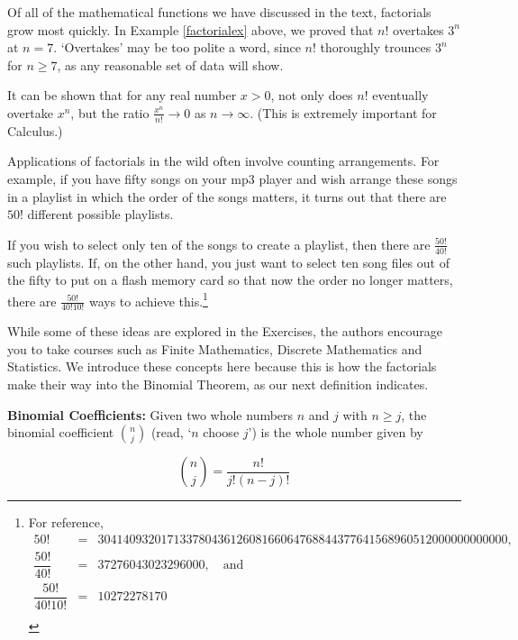 \documentclass{ximera}
\begin{document}
Of all of the mathematical functions we have discussed in the text, factorials grow most quickly.  In  Example \ref{factorialex} above, we proved that $n!$ overtakes $3^{n}$ at $n=7$.  `Overtakes' may be too polite a word, since $n!$ thoroughly trounces $3^n$ for $n \geq 7$, as any reasonable set of data will show. 

\smallskip

It can be shown that for any real number $x > 0$, not only does $n!$ eventually overtake $x^n$, but the ratio $\frac{x^n}{n!} \rightarrow 0$ as $n \rightarrow \infty$. (This is extremely important for Calculus.)

\smallskip

Applications of factorials in the wild often involve counting arrangements. For example, if you have fifty songs on your mp3 player and wish arrange these songs in a playlist in which the order of the songs matters, it turns out that there are $50!$ different possible playlists. 

\smallskip

If you wish to select only ten of the songs to create a playlist, then there are $\frac{50!}{40!}$ such playlists.  If, on the other hand, you just want to select ten song files out of the fifty to put on a flash memory card so that now the order no longer matters, there are $\frac{50!}{40! 10!}$ ways to achieve this.\footnote{For reference, \[\begin{array}{ccl} 50! & = &  30414093201713378043612608166064768844377641568960512000000000000, \\  \dfrac{50!}{40!} & = & 37276043023296000, \quad \text{and} \\ [5pt] \dfrac{50!}{40!  10!} & = & 10272278170 \\ \end{array}\]} 

\smallskip

 While some of these ideas are explored in the Exercises, the authors encourage you to take courses such as Finite Mathematics, Discrete Mathematics and Statistics. We introduce these concepts here because this is how the factorials make their way into the Binomial Theorem, as our next definition indicates.

\smallskip

\colorbox{ResultColor}{\bbm

\begin{defn} \label{binomialcoeff}  \textbf{Binomial Coefficients:}  Given two whole numbers $n$ and $j$ with $n \geq j$, the  binomial coefficient  {\boldmath $\displaystyle \binom{n}{j}$} (read, `$n$ choose $j$') is the whole number given by

\[ \binom{n}{j} = \dfrac{n!}{j! (n-j)!} \]

\end{defn}
\ebm}
\end{document}
